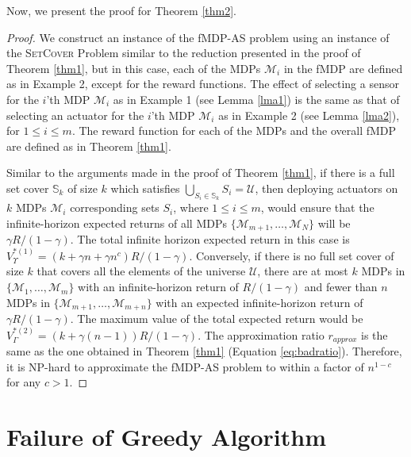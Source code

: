 \documentclass[twocolumn]{autart}    %
\begin{document}
Now, we present the proof for Theorem \ref{thm2}.

\begin{proof} We construct an instance of the fMDP-AS problem using an instance of the \textsc{SetCover} Problem similar to the reduction presented in the proof of Theorem \ref{thm1}, but in this case, each of the MDPs $\mathcal{M}_i$ in the fMDP are defined as in Example 2, except for the reward functions. The effect of selecting a sensor for the $i$'th MDP $\mathcal{M}_i$ as in Example 1 (see Lemma \ref{lma1}) is the same as that of selecting an actuator for the $i$'th MDP $\mathcal{M}_i$ as in Example 2 (see Lemma \ref{lma2}), for $1 \leq i \leq m$. The reward function for each of the MDPs and the overall fMDP are defined as in Theorem \ref{thm1}. 
  
Similar to the arguments made in the proof of Theorem \ref{thm1}, if there is a full set cover $\mathbb{S}_k$ of size $k$ which satisfies $\bigcup_{S_i \in \mathbb{S}_k} S_i  = \mathcal{U}$, then deploying actuators on $k$ MDPs $\mathcal{M}_i$ corresponding sets $S_i$, where $1 \leq i \leq m$, would ensure that the infinite-horizon expected returns of all MDPs $\{\mathcal{M}_{m+1}, \hdots, \mathcal{M}_{N} \}$ will be $\gamma R/(1-\gamma)$. The total infinite horizon expected return in this case is  $V_{\Upsilon}^{*(1)} = (k+\gamma n+ \gamma n^c) R/(1-\gamma)$. Conversely, if there is no full set cover of size $k$ that covers all the elements of the universe $\mathcal{U}$, there are at most $k$ MDPs in $\{\mathcal{M}_{1}, \hdots, \mathcal{M}_{m} \}$ with an infinite-horizon return of $R/(1-\gamma)$ and  fewer than $n$ MDPs in $\{\mathcal{M}_{m+1}, \hdots, \mathcal{M}_{m+n} \}$ with an expected infinite-horizon return of $\gamma R/(1-\gamma)$. The maximum value of the total expected return would be $V_{\Gamma}^{*(2)} = (k+\gamma (n-1)) R/(1-\gamma)$. The approximation ratio $r_{approx}$ is the same as the one obtained in Theorem \ref{thm1} (Equation \ref{eq:badratio}).
  Therefore, it is NP-hard to approximate the fMDP-AS problem to within a factor of $n^{1-c}$ for any $c>1$. 
\end{proof}


\section{Failure of Greedy Algorithm}
\label{app:failure_greedy}
\end{document}
